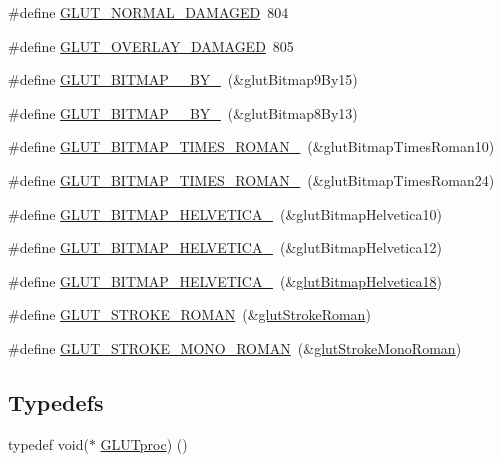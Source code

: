 \begin{DoxyCompactItemize}
\item 
\#define \hyperlink{glut_8_h_a6c8c766cfc7dd33026befb89de05b49f}{G\+L\+U\+T\+\_\+\+N\+O\+R\+M\+A\+L\+\_\+\+D\+A\+M\+A\+G\+ED}~804
\item 
\#define \hyperlink{glut_8_h_a27e1cc27b271dac2d0c51a1ff9d0ae06}{G\+L\+U\+T\+\_\+\+O\+V\+E\+R\+L\+A\+Y\+\_\+\+D\+A\+M\+A\+G\+ED}~805
\item 
\#define \hyperlink{glut_8_h_abd22ae2e12348f35e2822d9e23aa50de}{G\+L\+U\+T\+\_\+\+B\+I\+T\+M\+A\+P\+\_\+\_\+\+B\+Y\+\_}~(\&glut\+Bitmap9\+By15)
\item 
\#define \hyperlink{glut_8_h_a19b58769a20dd6fb34e6b5a2ecd42c2a}{G\+L\+U\+T\+\_\+\+B\+I\+T\+M\+A\+P\+\_\+\_\+\+B\+Y\+\_}~(\&glut\+Bitmap8\+By13)
\item 
\#define \hyperlink{glut_8_h_ab570839ce3413815606992f14dc9a9d4}{G\+L\+U\+T\+\_\+\+B\+I\+T\+M\+A\+P\+\_\+\+T\+I\+M\+E\+S\+\_\+\+R\+O\+M\+A\+N\+\_}~(\&glut\+Bitmap\+Times\+Roman10)
\item 
\#define \hyperlink{glut_8_h_a3a5b5a835fb02e6a681b8092fe25cc8c}{G\+L\+U\+T\+\_\+\+B\+I\+T\+M\+A\+P\+\_\+\+T\+I\+M\+E\+S\+\_\+\+R\+O\+M\+A\+N\+\_}~(\&glut\+Bitmap\+Times\+Roman24)
\item 
\#define \hyperlink{glut_8_h_ac11db7b9af4fb9c1b2e37be43728f34d}{G\+L\+U\+T\+\_\+\+B\+I\+T\+M\+A\+P\+\_\+\+H\+E\+L\+V\+E\+T\+I\+C\+A\+\_}~(\&glut\+Bitmap\+Helvetica10)
\item 
\#define \hyperlink{glut_8_h_a7148f404947be386e4a4cbd2ec84d15e}{G\+L\+U\+T\+\_\+\+B\+I\+T\+M\+A\+P\+\_\+\+H\+E\+L\+V\+E\+T\+I\+C\+A\+\_}~(\&glut\+Bitmap\+Helvetica12)
\item 
\#define \hyperlink{glut_8_h_aa2733cf18efd2cf595fe00e2eef5fd46}{G\+L\+U\+T\+\_\+\+B\+I\+T\+M\+A\+P\+\_\+\+H\+E\+L\+V\+E\+T\+I\+C\+A\+\_}~(\&\hyperlink{glut_8_h_ad57d041683756c27cdbb7a61285aacb6}{glut\+Bitmap\+Helvetica18})
\item 
\#define \hyperlink{glut_8_h_a8c868e8790fc8d62e4d6a3923cb2c007}{G\+L\+U\+T\+\_\+\+S\+T\+R\+O\+K\+E\+\_\+\+R\+O\+M\+AN}~(\&\hyperlink{glut_8_h_a6cbb84959750222990a4b0403109897e}{glut\+Stroke\+Roman})
\item 
\#define \hyperlink{glut_8_h_a6d845b04aa17e263c96e07b95872b404}{G\+L\+U\+T\+\_\+\+S\+T\+R\+O\+K\+E\+\_\+\+M\+O\+N\+O\+\_\+\+R\+O\+M\+AN}~(\&\hyperlink{glut_8_h_a4e03095fb5f41b25ebcef0a4e38f6ead}{glut\+Stroke\+Mono\+Roman})
\end{DoxyCompactItemize}
\subsection*{Typedefs}
\begin{DoxyCompactItemize}
\item 
typedef void($\ast$ \hyperlink{glut_8_h_a3ae3ba12b8b90253225790b5d7566dc6}{G\+L\+U\+Tproc}) ()
\end{DoxyCompactItemize}
